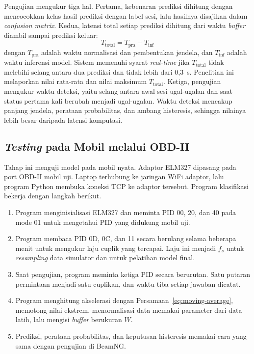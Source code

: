 Pengujian mengukur tiga hal. Pertama, kebenaran prediksi dihitung dengan mencocokkan kelas hasil prediksi dengan label sesi, lalu hasilnya disajikan dalam \textit{confusion matrix}. Kedua, latensi total setiap prediksi dihitung dari waktu \textit{buffer} diambil sampai prediksi keluar:
\begin{equation}
  T_{\mathrm{total}} = T_{\mathrm{pra}} + T_{\mathrm{inf}}
  \label{eq:met-latensi}
\end{equation}
dengan $T_{\mathrm{pra}}$ adalah waktu normalisasi dan pembentukan jendela, dan $T_{\mathrm{inf}}$ adalah waktu inferensi model. Sistem memenuhi syarat \textit{real-time} jika $T_{\mathrm{total}}$ tidak melebihi selang antara dua prediksi dan tidak lebih dari 0,3~s. Penelitian ini melaporkan nilai rata-rata dan nilai maksimum $T_{\mathrm{total}}$. Ketiga, pengujian mengukur waktu deteksi, yaitu selang antara awal sesi ugal-ugalan dan saat status pertama kali berubah menjadi ugal-ugalan. Waktu deteksi mencakup panjang jendela, perataan probabilitas, dan ambang histeresis, sehingga nilainya lebih besar daripada latensi komputasi.

\subsection{\textit{Testing} pada Mobil melalui OBD-II}
\label{subsec:uji-mobil}
Tahap ini menguji model pada mobil nyata. Adaptor ELM327 dipasang pada port OBD-II mobil uji. Laptop terhubung ke jaringan WiFi adaptor, lalu program Python membuka koneksi TCP ke adaptor tersebut. Program klasifikasi bekerja dengan langkah berikut.
\begin{enumerate}
  \item Program menginisialisasi ELM327 dan meminta PID 00, 20, dan 40 pada mode 01 untuk mengetahui PID yang didukung mobil uji.
  \item Program membaca PID 0D, 0C, dan 11 secara berulang selama beberapa menit untuk mengukur laju cuplik yang tercapai. Laju ini menjadi $f_{s}$ untuk \textit{resampling} data simulator dan untuk pelatihan model final.
  \item Saat pengujian, program meminta ketiga PID secara berurutan. Satu putaran permintaan menjadi satu cuplikan, dan waktu tiba setiap jawaban dicatat.
  \item Program menghitung akselerasi dengan Persamaan~\ref{eq:moving-average}, memotong nilai ekstrem, menormalisasi data memakai parameter dari data latih, lalu mengisi \textit{buffer} berukuran $W$.
  \item Prediksi, perataan probabilitas, dan keputusan histeresis memakai cara yang sama dengan pengujian di BeamNG.
\end{enumerate}

